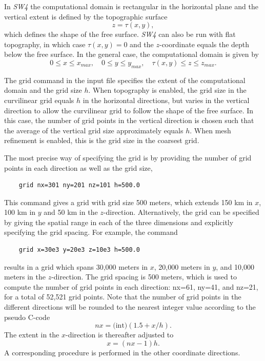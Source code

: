 \documentclass[11pt]{report}
\begin{document}
In \emph{SW4} the computational domain is rectangular in the horizontal plane and the vertical extent
is defined by the topographic surface
\[
	z=\tau(x,y),
\]
which defines the shape of the free surface. \emph{SW4} can also be run with flat topography, in
which case $\tau(x,y)=0$ and the $z$-coordinate equals the depth below the free surface. In the general
case, the computational domain is given by
\begin{equation}\label{eq:domain}
	0\leq x\leq x_{max},\quad 0\leq y\leq y_{max},\quad \tau(x,y) \leq z \leq z_{max}.
\end{equation}

The grid command in the input file specifies the extent of the computational domain and the grid
size $h$. When topography is enabled, the grid size in the curvilinear grid equals $h$ in the
horizontal directions, but varies in the vertical direction to allow the curvilinear grid to follow
the shape of the free surface. In this case, the number of grid points in the vertical direction is
chosen such that the average of the vertical grid size approximately equals $h$.
When mesh refinement is enabled, this is the grid size in the coarsest grid.

The most precise way of specifying the grid is by providing the number of grid points in each
direction as well as the grid size,
%
\begin{verbatim}
	grid nx=301 ny=201 nz=101 h=500.0 
\end{verbatim}
%
This command gives a grid with grid size 500 meters, which extends 150 km in $x$, 100 km in $y$ and
50 km in the $z$-direction. Alternatively, the grid can be specified by giving the spatial range in
each of the three dimensions and explicitly specifying the grid spacing. For example, the command
%
\begin{verbatim}
	grid x=30e3 y=20e3 z=10e3 h=500.0 
\end{verbatim}
%
results in a grid which spans 30,000 meters in $x$, 20,000 meters in $y$, and 10,000
meters in the $z$-direction.  The grid spacing is 500 meters, which is used to compute the
number of grid points in each direction: nx=61, ny=41, and nz=21, for a total of
52,521 grid points. Note that the number of grid points in the different directions will be
rounded to the nearest integer value according to the pseudo C-code
\begin{equation}\label{eq:nx-calculation}
	nx = \mbox{(int)} (1.5 + x/h).
\end{equation}
The extent in the $x$-direction is thereafter adjusted to
\begin{equation}\label{eq:x-calculation}
	x=(nx-1) h.
\end{equation}
A corresponding procedure is performed in the other coordinate directions.
\end{document}
